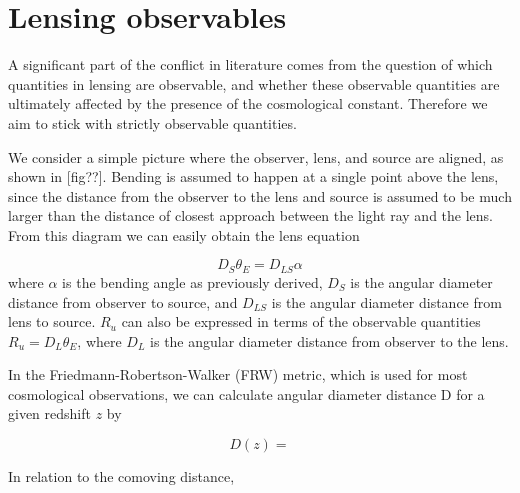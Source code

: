 \section{Lensing observables}

A significant part of the conflict in literature comes from the question of which quantities in lensing are observable, and whether these observable quantities are ultimately affected by the presence of the cosmological constant. Therefore we aim to stick with strictly observable quantities. 

We consider a simple picture where the observer, lens, and source are aligned, as shown in [fig??]. Bending is assumed to happen at a single point above the lens, since the distance from the observer to the lens and source is assumed to be much larger than the distance of closest approach between the light ray and the lens. From this diagram we can easily obtain the lens equation \citep{schneider1992gravitationallenses}

\begin{equation}
  D_S \theta_E = D_{LS} \alpha
  \label{eq:lens-eqn}
\end{equation}
where $\alpha$ is the bending angle as previously derived, $D_S$ is the angular diameter distance from observer to source, and $D_{LS}$ is the angular diameter distance from lens to source. $R_u$ can also be expressed in terms of the observable quantities $R_u = D_L \theta_E$, where $D_L$ is the angular diameter distance from observer to the lens.  

In the Friedmann-Robertson-Walker (FRW) metric, which is used for most cosmological observations, we can calculate angular diameter distance D for a given redshift $z$ by

\begin{equation}
  D(z) = 
  \label{eq:angular-diameter-distance}
\end{equation}

In relation to the comoving distance, 